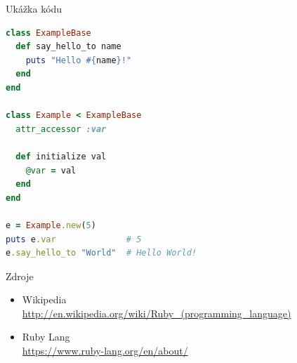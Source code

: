 \documentclass[pdf,slideColor,fyma]{prosper}
\begin{document}


\begin{slide}{Ukážka kódu}

\begin{lstlisting}[basicstyle=\tiny, language=Ruby]
class ExampleBase
  def say_hello_to name
    puts "Hello #{name}!"
  end
end

class Example < ExampleBase
  attr_accessor :var

  def initialize val
    @var = val
  end
end

e = Example.new(5)
puts e.var              # 5
e.say_hello_to "World"  # Hello World!
\end{lstlisting}

\end{slide}

\begin{slide}{Zdroje}

\begin{itemize}
\item{Wikipedia \\
  \tiny\url{ http://en.wikipedia.org/wiki/Ruby_(programming_language)}}
\item{Ruby Lang \\
  \tiny\url{ https://www.ruby-lang.org/en/about/}}
\end{itemize}
\end{slide}
\end{document}
